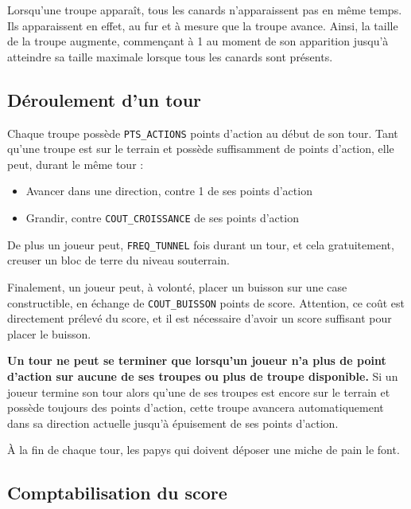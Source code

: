 Lorsqu'une troupe apparaît, tous les canards n'apparaissent pas en même temps. Ils apparaissent en
effet, au fur et à mesure que la troupe avance. Ainsi, la taille de la troupe
augmente, commençant à 1 au moment de son apparition jusqu'à atteindre sa taille maximale lorsque
tous les canards sont présents.

\subsection{Déroulement d'un tour}

Chaque troupe possède \texttt{PTS\_ACTIONS} points d'action au début de son tour.
Tant qu'une troupe est sur le terrain et possède suffisamment de points d'action, elle peut, durant le même tour :

\begin{itemize}
    \item Avancer dans une direction, contre 1 de ses points d'action
    \item Grandir, contre \texttt{COUT\_CROISSANCE} de ses points d'action
\end{itemize}

De plus un joueur peut, \texttt{FREQ\_TUNNEL} fois durant un tour, et cela gratuitement,
creuser un bloc de terre du niveau souterrain.

Finalement, un joueur peut, à volonté, placer un buisson sur une case constructible,
en échange de \texttt{COUT\_BUISSON} points de score. Attention, ce coût est directement
prélevé du score, et il est nécessaire d'avoir un score suffisant pour placer le
buisson.

\textbf{Un tour ne peut se terminer que lorsqu'un joueur n'a plus de point d'action sur aucune de ses troupes ou plus de troupe disponible.}
Si un joueur termine son tour alors qu'une de ses troupes est encore sur le terrain
et possède toujours des points
d'action, cette troupe avancera automatiquement dans sa direction actuelle jusqu'à épuisement de ses points
d'action.

À la fin de chaque tour, les papys qui doivent déposer une miche de pain le font.


\subsection{Comptabilisation du score}


